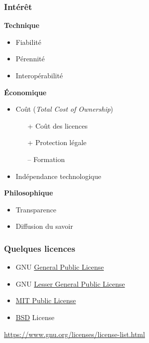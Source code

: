 \documentclass[10pt]{beamer}
\begin{document}

\begin{frame}
  \frametitle{Intérêt}

  \textbf{Technique}

  \begin{itemize}
  \item Fiabilité
  \item Pérennité
  \item Interopérabilité
  \end{itemize}

  \vfill
  
  \textbf{Économique}

  \begin{itemize}
  \item Coût (\emph{Total Cost of Ownership})
    \begin{itemize}
    \item[+] Coût des licences
    \item[+] Protection légale
    \item[--] Formation
    \end{itemize}
  \item Indépendance technologique
  \end{itemize}

  \vfill

  \textbf{Philosophique}
  \begin{itemize}
  \item Transparence
  \item Diffusion du savoir
  \end{itemize}
\end{frame}


\begin{frame}
  \frametitle{Quelques licences}

  \begin{itemize}
  \item GNU \href{https://www.gnu.org/copyleft/gpl.html}{General Public License}

    \vfill

  \item GNU \href{https://www.gnu.org/copyleft/lgpl.html}{Lesser General Public License}

    \vfill

  \item \href{http://opensource.org/licenses/mit-license.php}{MIT Public License}
    
    \vfill

  \item \href{http://www.freebsd.org/copyright/license.html}{BSD} License
    
  \end{itemize}

  \begin{center}
    \url{https://www.gnu.org/licenses/license-list.html}
  \end{center}
\end{frame}
\end{document}
